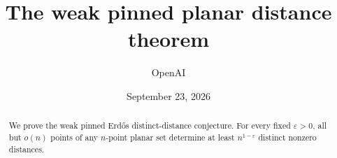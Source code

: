 \documentclass[11pt]{article}
\title{The weak pinned planar distance theorem}
\author{OpenAI}
\date{September 23, 2026}
\numberwithin{equation}{section}
\theoremstyle{definition}
\theoremstyle{remark}
\newcommand{\1}{\mathbf 1}
\begin{document}
\maketitle
\begin{abstract}
We prove the weak pinned Erd\H{o}s distinct-distance conjecture.
For every fixed $\varepsilon>0$, all but $o(n)$ points of any
$n$-point planar set determine at least $n^{1-\varepsilon}$ distinct
nonzero distances.
\end{abstract}
\tableofcontents







{\small


}
\end{document}
